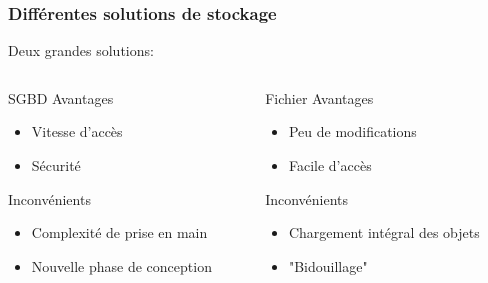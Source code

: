 \documentclass{beamer}
\begin{document}
            \begin{frame}
                \frametitle{Différentes solutions de stockage}
                Deux grandes solutions:
                \pause
                \begin{columns}[t]
                    \begin{column}{4cm}
                        \begin{block}{SGBD}
                            \pause
                            Avantages
                            \begin{itemize}
                                \pause
                                \item Vitesse d'accès
                                \pause
                                \item Sécurité
                            \end{itemize}
                            \pause
                            Inconvénients 
                            \begin{itemize}
                                \pause
                                \item Complexité de prise en main
                                \pause
                                \item Nouvelle phase de conception
                            \end{itemize}
                        \end{block}
                    \end{column}
                    \pause
                    \begin{column}{4cm}
                        \begin{block}{Fichier}
                            \pause
                            Avantages
                            \begin{itemize}
                                \pause
                                \item Peu de modifications
                                \pause
                                \item Facile d'accès
                            \end{itemize}
                            \pause
                            Inconvénients 
                            \begin{itemize}
                                \pause
                                \item Chargement intégral des objets
                                \pause
                                \item "Bidouillage"
                            \end{itemize}
                        \end{block}
                    \end{column}
                \end{columns}
            \end{frame}
\end{document}
